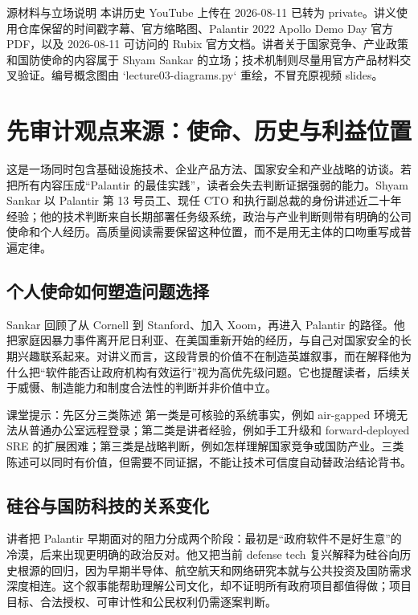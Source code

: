 \documentclass[a4paper]{article}
\begin{document}
\makecscover

\begin{warningbox}{源材料与立场说明}
本讲历史 YouTube 上传在 2026-08-11 已转为 private。讲义使用仓库保留的时间戳字幕、官方缩略图、Palantir 2022 Apollo Demo Day 官方 PDF，以及 2026-08-11 可访问的 Rubix 官方文档。讲者关于国家竞争、产业政策和国防使命的内容属于 Shyam Sankar 的立场；技术机制则尽量用官方产品材料交叉验证。编号概念图由 `lecture03-diagrams.py` 重绘，不冒充原视频 slides。
\end{warningbox}

\section{先审计观点来源：使命、历史与利益位置}

这是一场同时包含基础设施技术、企业产品方法、国家安全和产业战略的访谈。若把所有内容压成“Palantir 的最佳实践”，读者会失去判断证据强弱的能力。Shyam Sankar 以 Palantir 第 13 号员工、现任 CTO 和执行副总裁的身份讲述近二十年经验；他的技术判断来自长期部署任务级系统，政治与产业判断则带有明确的公司使命和个人经历。高质量阅读需要保留这种位置，而不是用无主体的口吻重写成普遍定律。

\subsection{个人使命如何塑造问题选择}

Sankar 回顾了从 Cornell 到 Stanford、加入 Xoom，再进入 Palantir 的路径。他把家庭因暴力事件离开尼日利亚、在美国重新开始的经历，与自己对国家安全的长期兴趣联系起来。对讲义而言，这段背景的价值不在制造英雄叙事，而在解释他为什么把“软件能否让政府机构有效运行”视为高优先级问题。它也提醒读者，后续关于威慑、制造能力和制度合法性的判断并非价值中立。

\begin{knowledgebox}{课堂提示：先区分三类陈述}
第一类是可核验的系统事实，例如 air-gapped 环境无法从普通办公室远程登录；第二类是讲者经验，例如手工升级和 forward-deployed SRE 的扩展困难；第三类是战略判断，例如怎样理解国家竞争或国防产业。三类陈述可以同时有价值，但需要不同证据，不能让技术可信度自动替政治结论背书。
\end{knowledgebox}

\subsection{硅谷与国防科技的关系变化}

讲者把 Palantir 早期面对的阻力分成两个阶段：最初是“政府软件不是好生意”的冷漠，后来出现更明确的政治反对。他又把当前 defense tech 复兴解释为硅谷向历史根源的回归，因为早期半导体、航空航天和网络研究本就与公共投资及国防需求深度相连。这个叙事能帮助理解公司文化，却不证明所有政府项目都值得做；项目目标、合法授权、可审计性和公民权利仍需逐案判断。
\end{document}
